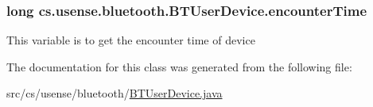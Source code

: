 \subsubsection[{encounter\+Time}]{\setlength{\rightskip}{0pt plus 5cm}long cs.\+usense.\+bluetooth.\+B\+T\+User\+Device.\+encounter\+Time\hspace{0.3cm}{\ttfamily [private]}}\label{classcs_1_1usense_1_1bluetooth_1_1_b_t_user_device_a8b9dc5ad6de9329193e508cdb77212b0}
This variable is to get the encounter time of device 

The documentation for this class was generated from the following file\+:\begin{DoxyCompactItemize}
\item 
src/cs/usense/bluetooth/\hyperlink{_b_t_user_device_8java}{B\+T\+User\+Device.\+java}\end{DoxyCompactItemize}
